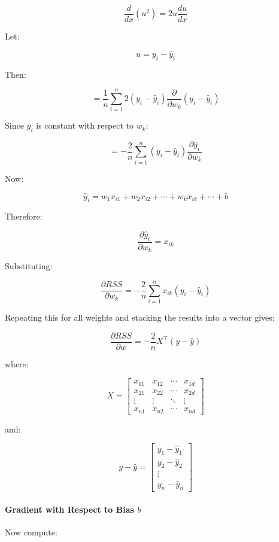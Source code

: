 \documentclass[10pt,a4paper]{article}
\begin{document}
	\[
	\frac{d}{dx}(u^2) = 2u\frac{du}{dx}
	\]
	
	Let:
	
	\[
	u = y_i - \hat{y}_i
	\]
	
	Then:
	
	\[
	=
	\frac{1}{n}
	\sum_{i=1}^{n}
	2(y_i - \hat{y}_i)
	\frac{\partial}{\partial w_k}(y_i - \hat{y}_i)
	\]
	
	Since \(y_i\) is constant with respect to \(w_k\):
	
	\[
	=
	-\frac{2}{n}
	\sum_{i=1}^{n}
	(y_i - \hat{y}_i)
	\frac{\partial \hat{y}_i}{\partial w_k}
	\]
	
	Now:
	
	\[
	\hat{y}_i
	=
	w_1x_{i1} + w_2x_{i2} + \cdots + w_kx_{ik} + \cdots + b
	\]
	
	Therefore:
	
	\[
	\frac{\partial \hat{y}_i}{\partial w_k}
	=
	x_{ik}
	\]
	
	Substituting:
	
	\[
	\boxed{
	\frac{\partial RSS}{\partial w_k}
	=
	-\frac{2}{n}
	\sum_{i=1}^{n}
	x_{ik}(y_i - \hat{y}_i)
	}
	\]
	
	Repeating this for all weights and stacking the results into a vector gives:
	
	\[
	\boxed{
	\frac{\partial RSS}{\partial w}
	=
	-\frac{2}{n}
	X^\top (y - \hat{y})
	}
	\]
	
	where:
	
	\[
	X =
	\begin{bmatrix}
	x_{11} & x_{12} & \cdots & x_{1d} \\
	x_{21} & x_{22} & \cdots & x_{2d} \\
	\vdots & \vdots & \ddots & \vdots \\
	x_{n1} & x_{n2} & \cdots & x_{nd}
	\end{bmatrix}
	\]
	
	and:
	
	\[
	y - \hat{y}
	=
	\begin{bmatrix}
	y_1 - \hat{y}_1 \\
	y_2 - \hat{y}_2 \\
	\vdots \\
	y_n - \hat{y}_n
	\end{bmatrix}
	\]
	
	\paragraph{Gradient with Respect to Bias \(b\)}
	
	Now compute:
	
\end{document}
